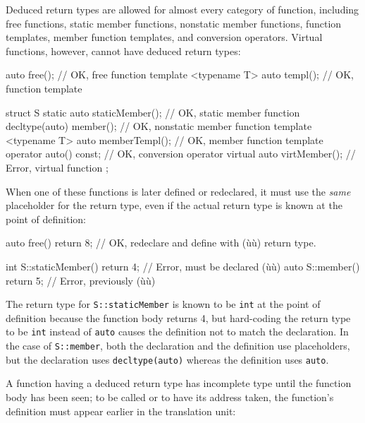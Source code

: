Deduced return types are allowed for almost every category of function,
including free functions, static member functions, nonstatic member
functions, function templates, member function templates, and conversion
operators. Virtual functions, however, cannot have deduced return types:

\begin{emcppslisting}[emcppsbatch=e3,emcppsstandards={c++14}]
auto free();                                   // OK, free function
template <typename T> auto templ();            // OK, function template

struct S
{
    static auto staticMember();                // OK, static member function
    decltype(auto) member();                   // OK, nonstatic member function
    template <typename T> auto memberTempl();  // OK, member function template
    operator auto() const;                     // OK, conversion operator
    virtual auto virtMember();                 // Error, virtual function
};
\end{emcppslisting}
    

\noindent When one of these functions is later defined or redeclared, it must use
the \emph{same} placeholder for the return type, even if the actual
return type is known at the point of definition:

\begin{emcppslisting}[emcppsbatch=e3]
auto free() { return 8; }  // OK, redeclare and define with (ù{}ù) return type.

int S::staticMember() { return 4; }  // Error, must be declared (ù{}ù)
auto S::member() { return 5; }       // Error, previously (ù{}ù)
\end{emcppslisting}
    

\noindent The return type for \lstinline!S::staticMember! is known to be \lstinline!int!
at the point of definition because the function body returns
4, but hard-coding the return type to be \lstinline!int! instead of
\lstinline!auto! causes the definition not to match the declaration. In the
case of \lstinline!S::member!, both the declaration and the definition use
placeholders, but the declaration uses \lstinline!decltype(auto)! whereas
the definition uses \lstinline!auto!.

A function having a deduced return type has incomplete type until the
function body has been seen; to be called or to have its address taken,
the function's definition must appear earlier in the translation unit:

